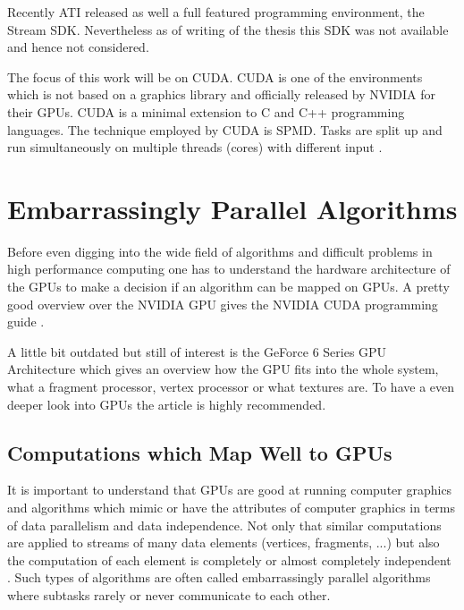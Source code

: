 Recently \gls{ATI} released as well a full featured programming environment, the
Stream \gls{SDK}. Nevertheless as of writing of the thesis this \gls{SDK} was not
available and hence not considered. 


The focus of this work will be on \gls{CUDA}. \Gls{CUDA} is one of the
environments which is not based on a graphics library and officially released by
\gls{NVIDIA} for their \glspl{GPU}. \Gls{CUDA} is a minimal extension to C and
C++ programming languages. The technique employed by \gls{CUDA} is \gls{SPMD}.
Tasks are split up and run simultaneously on multiple threads (cores) with
different input \citep{citeulike:3072519}.

\section{Embarrassingly Parallel Algorithms} %
\label{ssub:choosing_a_fast_algorithm}
Before even digging into the wide field of algorithms and difficult problems in
high performance computing one has to understand the hardware architecture of
the \glspl{GPU} to make a decision if an algorithm can be mapped on \glspl{GPU}.
A pretty good overview over the \gls{NVIDIA} \gls{GPU} gives the 
\gls{NVIDIA} \gls{CUDA} programming guide \citep{citeulike:3325943}. 

A little bit outdated but still of interest is the GeForce 6 Series
\gls{GPU} Architecture \citep{citeulike:3757915} which gives an overview how the
\gls{GPU} fits into the whole system, what a fragment processor, vertex
processor or what textures are. To have a even deeper look into \glspl{GPU} the
article \citep{citeulike:2790995} is highly recommended.

\subsection{Computations which Map Well to GPUs} %
\label{par:computations_which_map_well_to_GPUs}
It is important to understand that \glspl{GPU} are good at running computer
graphics and algorithms which mimic or have the attributes of computer graphics
in terms of data parallelism and data independence. Not only that similar
computations are applied to streams of many data elements (vertices, fragments,
...) but also the computation of each element is completely or almost completely
independent \citep{citeulike:3733428}. Such types of algorithms are often called
embarrassingly parallel algorithms where subtasks rarely or never communicate to
each other.


